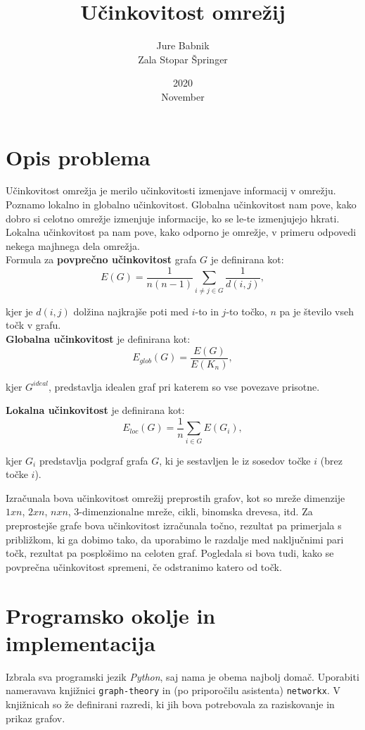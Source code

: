 \documentclass[a4paper, 16pt]{article}
\title{Učinkovitost omrežij}
\date{2020\\ November}
\author{Jure Babnik \\  Zala Stopar Špringer}
\begin{document}
\maketitle

\section{Opis problema}

Učinkovitost omrežja je merilo učinkovitosti izmenjave informacij v omrežju. Poznamo lokalno in globalno učinkovitost. Globalna učinkovitost nam pove, kako dobro si celotno omrežje
izmenjuje informacije, ko se le-te izmenjujejo hkrati. Lokalna učinkovitost pa nam pove, kako odporno je omrežje, v primeru odpovedi nekega majhnega dela omrežja.\\

Formula za \textbf{povprečno učinkovitost} grafa $G$ je definirana kot:
$$ E(G) = \frac{1}{n(n-1)} \sum_{i\neq j \in G} \frac{1}{d(i,j)},$$

kjer je $d(i,j)$ dolžina najkrajše poti med $i$-to in $j$-to točko, $n$ pa je število vseh točk v grafu.\\

\textbf{Globalna učinkovitost} je definirana kot:
$$ E_{glob}(G) = \frac{E(G)}{E(K_n)}, $$

kjer $G^{ideal}$, predstavlja idealen graf pri katerem so vse povezave prisotne.


\textbf{Lokalna učinkovitost} je definirana kot:
$$ E_{loc}(G) = \frac{1}{n} \sum_{i \in G} E(G_i), $$

kjer $G_i$ predstavlja podgraf grafa $G$, ki je sestavljen le iz sosedov točke $i$ (brez točke $i$).

Izračunala bova učinkovitost omrežij preprostih grafov, kot so mreže dimenzije $1 x n$, $2 x n$, $n x n$, 3-dimenzionalne mreže, cikli, binomska drevesa, itd.
Za preprostejše grafe bova učinkovitost izračunala točno, rezultat pa primerjala s približkom, ki ga dobimo tako, da uporabimo le razdalje med naključnimi pari točk, 
rezultat pa posplošimo na celoten graf. Pogledala si bova tudi, kako se povprečna učinkovitost spremeni, če odstranimo katero od točk. 

\section{Programsko okolje in implementacija}

Izbrala sva programski jezik \emph{Python}, saj nama je obema najbolj domač. Uporabiti nameravava knjižnici \texttt{graph-theory} in (po priporočilu asistenta) \texttt{networkx}.
V knjižnicah so že definirani razredi, ki jih bova potrebovala za raziskovanje in prikaz grafov. 
\end{document}
